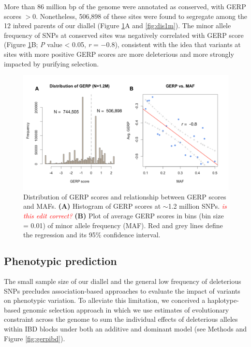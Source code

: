 \documentclass[9pt,twocolumn,twoside]{gsajnl}
\newcommand{\jri}[1]{\textcolor{red}{ \emph{ #1}} }
\begin{document}
More than 86 million bp of the genome were annotated as conserved, with GERP scores $>0$.
Nonetheless, 506,898 of these sites were found to segregate among the 12 inbred parents of our diallel (Figure \ref{fig:gerpmaf}A and \ref{fig:dis1m}).
The minor allele frequency of SNPs at conserved sites was negatively correlated with GERP score (Figure \ref{fig:gerpmaf}B; \emph{P} value < 0.05, \emph{r} = $-0.8$), consistent with the idea that variants at sites with more positive GERP scores are more deleterious and more strongly impacted by purifying selection.

\begin{figure}[htbp]
\centering
\includegraphics[width=\linewidth]{Figure_gerpmaf.pdf}
\caption{Distribution of GERP scores and relationship between GERP scores and MAFs. \textbf{(A)} Histogram of GERP scores at $\sim$1.2 million SNPs. \jri{is this edit correct?} \textbf{(B)} Plot of average GERP scores in bins (bin size = 0.01) of minor allele frequency (MAF). Red and grey lines define the regression and its 95\% confidence interval.}
\label{fig:gerpmaf}
\end{figure}


\subsection*{Phenotypic prediction}

The small sample size of our diallel and the general low frequency of deleterious SNPs precludes association-based approaches to evaluate the impact of variants on phenotypic variation.
To alleviate this limitation, we conceived a haplotype-based genomic selection approach in which we use estimates of evolutionary constraint across the genome \citep{rodgers2015recombination} to sum the individual effects of deleterious alleles within IBD blocks under both an additive and dominant model (see Methods and Figure \ref{fig:gerpibd}). 
\end{document}
